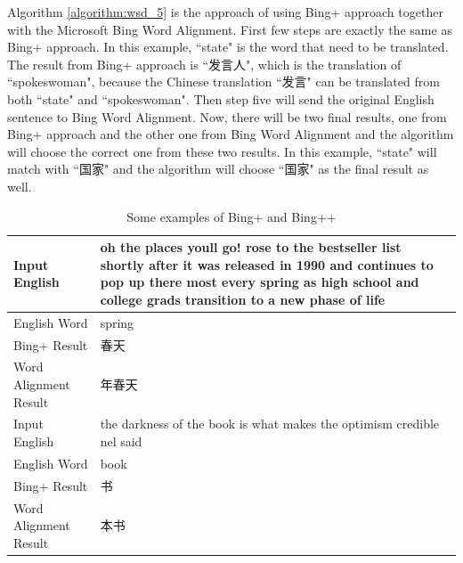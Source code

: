 \begin{CJK}{UTF8}{gbsn}
Algorithm \ref{algorithm:wsd_5} is the approach of using Bing+ approach together with the Microsoft Bing Word Alignment. First few steps are exactly the same as Bing+ approach. In this example, ``state" is the word that need to be translated. The result from Bing+ approach is ``发言人", which is the translation of ``spokeswoman", because the Chinese translation ``发言" can be translated from both ``state" and ``spokeswoman". Then step five will send the original English sentence to Bing Word Alignment. Now, there will be two final results, one from Bing+ approach and the other one from Bing Word Alignment and the algorithm will choose the correct one from these two results. In this example, ``state" will match with ``国家" and the algorithm will choose ``国家" as the final result as well.


\begin{table}[ht]
    \caption{Some examples of Bing+ and Bing++}
    \label{table:bing_plus_plus_3}
    
    \begin{center}
    \begin{tabular}{| p{2.5cm} | p{4cm} |}
        \hline
        Input English & oh the places youll go! rose to the bestseller list shortly after it was released in 1990 and continues to pop up there most every spring as high school and college grads transition to a new phase of life\\
        \hline
        English Word & spring \\
        \hline
        Bing+ Result & 春天\\
        \hline
        Word Alignment Result & 年春天\\
        \hline
        Input English & the darkness of the book is what makes the optimism credible nel said\\
        \hline
        English Word & book \\
        \hline
        Bing+ Result & 书\\
        \hline
        Word Alignment Result & 本书\\
        \hline
    \end{tabular}
    \end{center}
\end{table}


\end{CJK}
